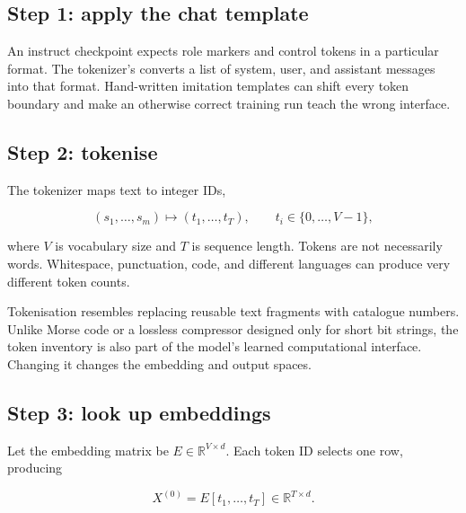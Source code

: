 \subsection{Step 1: apply the chat template}

An instruct checkpoint expects role markers and control tokens in a particular
format.
The tokenizer's  converts a list of system, user, and
assistant messages into that format.
Hand-written imitation templates can shift every token boundary and make an
otherwise correct training run teach the wrong interface.

\subsection{Step 2: tokenise}

The tokenizer maps text to integer IDs,

\begin{equation}
    (s_1,\ldots,s_m) \longmapsto (t_1,\ldots,t_T),
    \qquad t_i\in\{0,\ldots,V-1\},
    \label{eq:text-to-token-ids}
\end{equation}

where $V$ is vocabulary size and $T$ is sequence length.
Tokens are not necessarily words.
Whitespace, punctuation, code, and different languages can produce very
different token counts.

\begin{plainlanguage}
Tokenisation resembles replacing reusable text fragments with catalogue
numbers.
Unlike Morse code or a lossless compressor designed only for short bit strings,
the token inventory is also part of the model's learned computational interface.
Changing it changes the embedding and output spaces.
\end{plainlanguage}

\subsection{Step 3: look up embeddings}

Let the embedding matrix be $E\in\mathbb{R}^{V\times d}$.
Each token ID selects one row, producing

\begin{equation}
    X^{(0)} = E[t_1,\ldots,t_T]
    \in\mathbb{R}^{T\times d}.
    \label{eq:embedding-lookup}
\end{equation}


